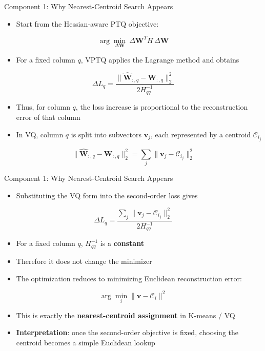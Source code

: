 \begin{frame}{Component 1: Why Nearest-Centroid Search Appears}
  \begin{itemize}
    \item Start from the Hessian-aware PTQ objective:
  \end{itemize}
  \[
    \arg\min_{\Delta \mathbf W}\ \Delta \mathbf W^T H\,\Delta \mathbf W
  \]
  \begin{itemize}
    \item For a fixed column $q$, VPTQ applies the Lagrange method and obtains
  \end{itemize}
  \[
    \Delta L_q
    =
    \frac{\|\hat{\mathbf W}_{:,q}-\mathbf W_{:,q}\|_2^2}{2H_{qq}^{-1}}
  \]
  \begin{itemize}
    \item Thus, for column $q$, the loss increase is proportional to the reconstruction error of that column
    \item In VQ, column $q$ is split into subvectors $\mathbf v_j$, each represented by a centroid $\mathcal C_{i_j}$
  \end{itemize}
  \[
    \|\hat{\mathbf W}_{:,q}-\mathbf W_{:,q}\|_2^2
    =
    \sum_j \|\mathbf v_j-\mathcal C_{i_j}\|_2^2
  \]
\end{frame}

\begin{frame}{Component 1: Why Nearest-Centroid Search Appears}
  \begin{itemize}
    \item Substituting the VQ form into the second-order loss gives
  \end{itemize}
  \[
    \Delta L_q
    =
    \frac{\sum_j \|\mathbf v_j-\mathcal C_{i_j}\|_2^2}{2H_{qq}^{-1}}
  \]
  \begin{itemize}
    \item For a fixed column $q$, $H_{qq}^{-1}$ is a \textbf{constant}
    \item Therefore it does not change the minimizer
    \vspace{0.3em}
    \item The optimization reduces to minimizing Euclidean reconstruction error:
  \end{itemize}
  \[
    \arg\min_i \|\mathbf v-\mathcal C_i\|^2
  \]
  \begin{itemize}
    \item This is exactly the \textbf{nearest-centroid assignment} in K-means / VQ
    \item \textbf{Interpretation}: once the second-order objective is fixed, choosing the centroid becomes a simple Euclidean lookup
  \end{itemize}
\end{frame}

